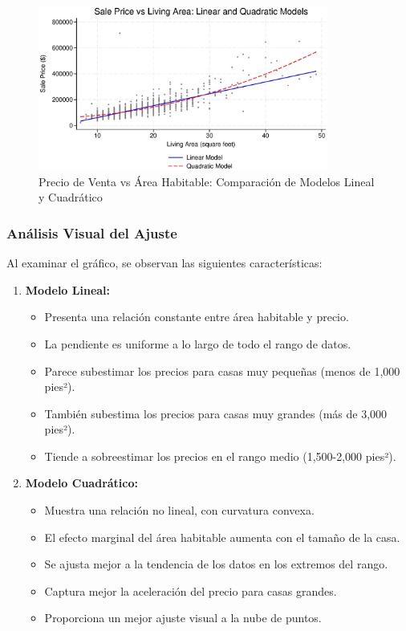 \documentclass[12pt]{article}
\begin{document}
\begin{figure}[htbp]
    \centering
    \includegraphics[width=0.85\textwidth]{Figures/0205-fitted_comparison.eps}
    \caption{Precio de Venta vs Área Habitable: Comparación de Modelos Lineal y Cuadrático}
    \label{fig:fitted_comparison}
\end{figure}

\subsubsection*{Análisis Visual del Ajuste}

Al examinar el gráfico, se observan las siguientes características:

\begin{enumerate}
    \item \textbf{Modelo Lineal:} 
    \begin{itemize}
        \item Presenta una relación constante entre área habitable y precio.
        \item La pendiente es uniforme a lo largo de todo el rango de datos.
        \item Parece subestimar los precios para casas muy pequeñas (menos de 1,000 pies²).
        \item También subestima los precios para casas muy grandes (más de 3,000 pies²).
        \item Tiende a sobreestimar los precios en el rango medio (1,500-2,000 pies²).
    \end{itemize}
    
    \item \textbf{Modelo Cuadrático:}
    \begin{itemize}
        \item Muestra una relación no lineal, con curvatura convexa.
        \item El efecto marginal del área habitable aumenta con el tamaño de la casa.
        \item Se ajusta mejor a la tendencia de los datos en los extremos del rango.
        \item Captura mejor la aceleración del precio para casas grandes.
        \item Proporciona un mejor ajuste visual a la nube de puntos.
    \end{itemize}
\end{enumerate}
\end{document}
